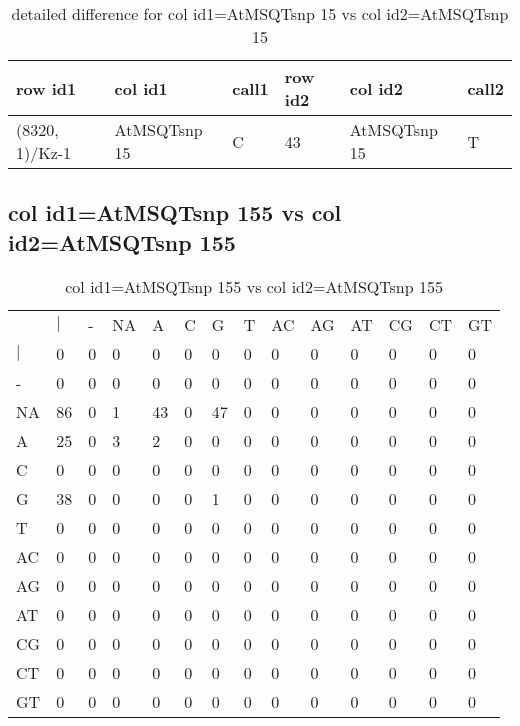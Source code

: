 \begin{center}
\begin{longtable}{|l|l|l|l|l|l|}
\caption{detailed difference for col id1=AtMSQTsnp 15 vs col id2=AtMSQTsnp 15} \label{table_dm539}\\
\hline
row id1&col id1&call1&row id2&col id2&call2\\
\hline
(8320, 1)/Kz-1&AtMSQTsnp 15&C&43&AtMSQTsnp 15&T\\
\hline
\end{longtable}
\end{center}

\subsection{col id1=AtMSQTsnp 155 vs col id2=AtMSQTsnp 155}
\begin{center}
\begin{longtable}{|l|l|l|l|l|l|l|l|l|l|l|l|l|l|}
\caption{col id1=AtMSQTsnp 155 vs col id2=AtMSQTsnp 155} \label{table_dm540}\\
\hline
\\
\hline
&$|$&-&NA&A&C&G&T&AC&AG&AT&CG&CT&GT\\
$|$&0&0&0&0&0&0&0&0&0&0&0&0&0\\
-&0&0&0&0&0&0&0&0&0&0&0&0&0\\
NA&86&0&1&43&0&47&0&0&0&0&0&0&0\\
A&25&0&3&2&0&0&0&0&0&0&0&0&0\\
C&0&0&0&0&0&0&0&0&0&0&0&0&0\\
G&38&0&0&0&0&1&0&0&0&0&0&0&0\\
T&0&0&0&0&0&0&0&0&0&0&0&0&0\\
AC&0&0&0&0&0&0&0&0&0&0&0&0&0\\
AG&0&0&0&0&0&0&0&0&0&0&0&0&0\\
AT&0&0&0&0&0&0&0&0&0&0&0&0&0\\
CG&0&0&0&0&0&0&0&0&0&0&0&0&0\\
CT&0&0&0&0&0&0&0&0&0&0&0&0&0\\
GT&0&0&0&0&0&0&0&0&0&0&0&0&0\\
\hline
\end{longtable}
\end{center}

